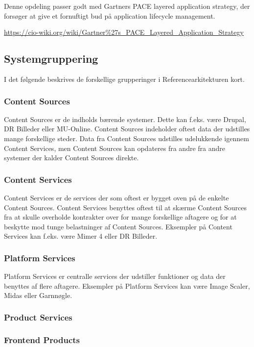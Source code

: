 \documentclass{article}
\begin{document}
Denne opdeling passer godt med Gartners PACE layered application strategy, der forsøger at give et fornuftigt bud på application lifecycle management.  

\url{https://cio-wiki.org/wiki/Gartner%27s_PACE_Layered_Application_Strategy}


\subsection{Systemgruppering}
I det følgende beskrives de forskellige grupperinger i Referencearkitekturen kort.
\subsubsection{Content Sources}
Content Sources er de indholds bærende systemer. Dette kan f.eks. være Drupal, DR Billeder eller MU-Online. Content Sources indeholder oftest data der udstilles mange forskellige steder. Data fra Content Sources udstilles udelukkende igennem Content Services, men Content Sources kan opdateres fra andre fra andre systemer der kalder Content Sources direkte.
\subsubsection{Content Services}
Content Services er de services der som oftest er bygget oven på de enkelte Content Sources. Content Services benyttes oftest til at skærme Content Sources fra at skulle overholde kontrakter over for mange forskellige aftagere og for at beskytte mod tunge belastninger af Content Sources.
Eksempler på Content Services kan f.eks. være Mimer 4 eller DR Billeder.
\subsubsection{Platform Services}
Platform Services er centralle services der udstiller funktioner og data der benyttes af flere aftagere. Eksempler på Platform Services kan være Image Scaler, Midas eller Garnnøgle.
\subsubsection{Product Services}

\subsubsection{Frontend Products}
\end{document}
